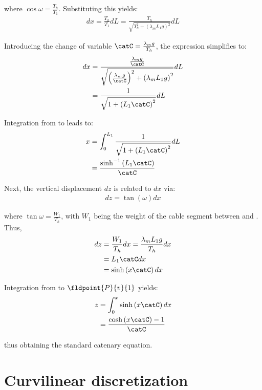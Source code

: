 where $\cos{\omega} = \frac{T_h}{T_1}$. Substituting this yields:
\begin{align}
	dx = \frac{T_h}{T_1} dL = \frac{T_h}{\sqrt{T_h^2 + \left(\lambda_m L_1 g\right)^2}} dL
\end{align}

Introducing the change of variable $\catC = \frac{\lambda_m g}{T_h}$, the expression simplifies to:
\begin{align}
	dx & = \frac{\frac{\lambda_m g}{\catC}}{\sqrt{\left(\frac{\lambda_m g}{\catC}\right)^2 + \left(\lambda_m L_1 g\right)^2}} dL \\
	   & = \frac{1}{\sqrt{1 + \left(L_1 \catC\right)^2}} dL
\end{align}

Integration from  to  leads to:
\begin{align}
	x & = \int_0^{L_1} \frac{1}{\sqrt{1 + \left(L_1 \catC\right)^2}} dL \\
	  & = \frac{\sinh^{-1}\left(L_1 \catC\right)}{\catC}
\end{align}

Next, the vertical displacement $dz$ is related to $dx$ via:
\begin{align}
	dz = \tan{\left(\omega\right)} dx
\end{align}

where $\tan{\omega} = \frac{W_1}{T_h}$, with $W_1$ being the weight of the cable segment between
 and . Thus,
\begin{align}
	dz & = \frac{W_1}{T_h} dx = \frac{\lambda_m L_1 g}{T_h} dx \\
	   & = L_1 \catC dx                                        \\
	   & = \sinh\left(x \catC\right) dx
\end{align}

Integration from  to $\fldpoint{P}{v}{1}$ yields:
\begin{align}
	z & = \int_0^x \sinh\left(x \catC\right) dx       \\
	  & = \frac{\cosh\left(x \catC\right) - 1}{\catC}
\end{align}

thus obtaining the standard catenary equation.

\section{Curvilinear discretization}
\label{mb_curvilinear_discretization}


